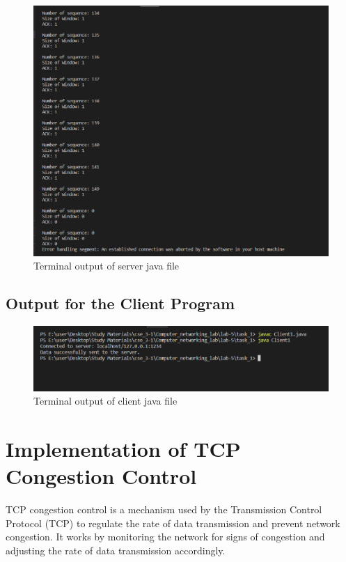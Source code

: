 \documentclass[11pt]{article}
\begin{document}
\begin{figure}[!h]
\centering
\includegraphics[width=\textwidth]{f_server3.png}
\caption{Terminal output of server java file }
\end{figure}
\FloatBarrier


\subsection{Output for the Client Program}

  \begin{figure}[!h]
\centering
\includegraphics[width=\textwidth]{f_client.png}
\caption{Terminal output of client java file }
\end{figure}
\FloatBarrier

\section{Implementation of TCP Congestion Control}
TCP congestion control is a mechanism used by the Transmission Control Protocol (TCP) to regulate the rate of data transmission and prevent network congestion. It works by monitoring the network for signs of congestion and adjusting the rate of data transmission accordingly.
\end{document}
